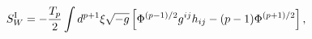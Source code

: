 \begin{equation}
S^{{\rm I}}_{W}=-\frac{T_p}{2}\int d^{p+1}{\xi}\sqrt{-g}\left[{\Phi}^{(p-1)/2}
g^{ij}h_{ij}-(p-1){\Phi}^{(p+1)/2}\right],
\end{equation}

